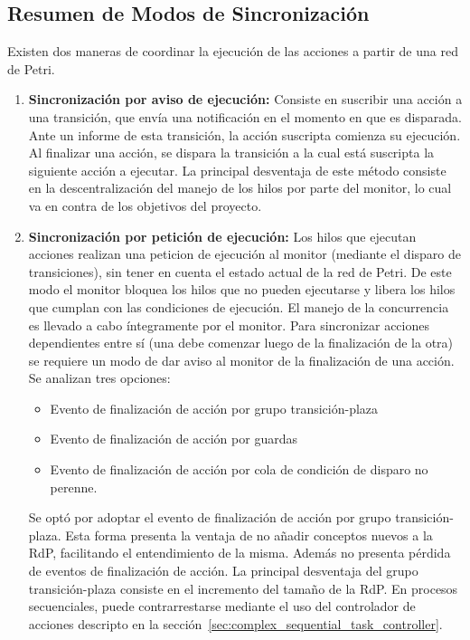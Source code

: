 \subsection{Resumen de Modos de Sincronización}
\label{sec:resumen_sincronizacion}
Existen dos maneras de coordinar la ejecución de las acciones a partir de una
red de Petri.\\ 
\begin{enumerate}
  \item \textbf{Sincronización por aviso de ejecución: } Consiste en suscribir
  una acción a una transición, que envía una notificación en el momento en que
  es disparada. Ante un informe de esta transición, la acción suscripta
  comienza su ejecución.
  Al finalizar una acción, se dispara la transición a la cual está suscripta la
  siguiente acción a ejecutar.
  La principal desventaja de este método consiste en la descentralización del
  manejo de los hilos por parte del monitor, lo cual va en contra de los objetivos del
  proyecto.
  \item \textbf{Sincronización por petición de ejecución: } Los hilos que
  ejecutan acciones realizan una peticion de ejecución al monitor (mediante el
  disparo de transiciones), sin tener en cuenta el estado actual de la red de
  Petri. De este modo el monitor bloquea los hilos que no pueden ejecutarse y
  libera los hilos que cumplan con las condiciones de ejecución. El manejo de
  la concurrencia es llevado a cabo íntegramente por el monitor.
  Para sincronizar acciones dependientes entre sí (una debe comenzar luego de
  la finalización de la otra) se requiere un modo de dar aviso al monitor de
  la finalización de una acción. Se analizan tres opciones:
  \begin{itemize}
      \item Evento de finalización de acción por grupo transición-plaza
	  \item Evento de finalización de acción por guardas
	  \item Evento de finalización de acción por cola de condición de disparo no
	  perenne.
  \end{itemize}
  Se optó por adoptar el evento de finalización de acción por grupo
  transición-plaza. Esta forma presenta la ventaja de no añadir
  conceptos nuevos a la RdP, facilitando el entendimiento de la misma. Además
  no presenta pérdida de eventos de finalización de acción.
  La principal desventaja del grupo transición-plaza consiste en el incremento
  del tamaño de la RdP. En procesos secuenciales, puede contrarrestarse mediante
  el uso del controlador de acciones descripto en la
  sección~\ref{sec:complex_sequential_task_controller}.
\end{enumerate}
 

 
 
 
 
